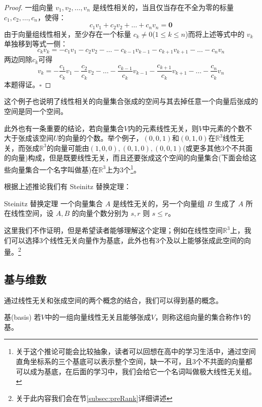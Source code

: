 \begin{proof}
	一组向量 $v_1, v_2, \dots, v_n$ 是线性相关的，当且仅当存在不全为零的标量 $c_1, c_2, \dots, c_n$，使得：$$c_1 v_1 + c_2 v_2 + \dots + c_n v_n = \mathbf{0}$$由于向量组线性相关，至少存在一个标量 $c_k \neq 0$($1 \leq k \leq n$)而将上述等式中的 $v_k$ 单独移到等式一侧：$$c_k v_k = -c_1 v_1 - c_2 v_2 - \dots - c_{k-1} v_{k-1} - c_{k+1} v_{k+1} - \dots - c_n v_n$$两边同除$c_k$可得$$v_k = -\frac{c_1}{c_k} v_1 - \frac{c_2}{c_k} v_2 - \dots - \frac{c_{k-1}}{c_k} v_{k-1} - \frac{c_{k+1}}{c_k} v_{k+1} - \dots - \frac{c_n}{c_k} v_n$$本题得证。$\square$
\end{proof}

这个例子也说明了线性相关的向量集合张成的空间与其去掉任意一个向量后张成的空间是同一个空间。

此外也有一条重要的结论，若向量集合$V$内的元素线性无关，则$V$中元素的个数不大于张成该空间$U$的向量的个数。举个例子，$\left( 0,0,1 \right)$和$(0,1,0)$在$\mathbb{R}^3$线性无关，而张成$\mathbb{R}^3$的向量可能由$(1,0,0),(0,1,0),(0,0,1)$(或更多其他3个不共面的向量)构成，但是既要线性无关，而且还要张成这个空间的向量集合(下面会给这些向量集合一个名字叫做基)在$\mathbb{R}^3$上为3个\footnote{关于这个推论可能会比较抽象，读者可以回想在高中的学习生活中，通过空间直角坐标系的三个基底可以表示整个空间，缺一不可，且3个不共面的向量都可以成为基底，在后面的学习中，我们会给它一个名词叫做极大线性无关组。}。

根据上述推论我们有 Steinitz 替换定理：

\begin{theorem}{Steinitz 替换定理}
	\label{the:Steinitz}
	一个向量集合 $ A $ 是线性无关的，另一个向量组 $ B $ 生成了 $ A $ 所在线性空间，设 $A,B$ 的向量个数分别为 $s,r$ 则 $s\le r$。
\end{theorem}

这里我们不作证明，但是希望读者能够理解这个定理；例如在线性空间$\mathbb{R}^3$上，我们可以选择3个线性无关向量作为基底，此外也有3个及以上能够张成此空间的向量。\footnote{关于此内容我们会在节\ref{subsec:preRank}详细讲述}

\subsection{基与维数}

通过线性无关和张成空间的两个概念的结合，我们可以得到基的概念。

\begin{definition}{基(basis)}
	若$V$中的一组向量线性无关且能够张成$V$，则称这组向量的集合称作$V$的基。
\end{definition}

